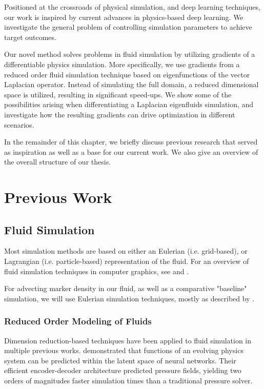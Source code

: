 Positioned at the crossroads of physical simulation, and deep learning
techniques, our work is inspired by current advances in physics-based deep
learning. We investigate the general problem of controlling simulation
parameters to achieve target outcomes.

Our novel method solves problems in fluid simulation by utilizing gradients of
a differentiable physics simulation. More specifically, we use gradients from
a reduced order fluid simulation technique based on eigenfunctions of the vector
Laplacian operator. Instead of simulating the full domain, a reduced dimensional
space is utilized, resulting in significant speed-ups. We show some of the
possibilities arising when differentiating a Laplacian eigenfluids simulation,
and investigate how the resulting gradients can drive optimization in different
scenarios.

In the remainder of this chapter, we briefly discuss previous research that
served as inspiration as well as a base for our current work. We also give an
overview of the overall structure of our thesis. 

\section{Previous Work}
\subsection{Fluid Simulation}
Most simulation methods are based on either an Eulerian (i.e.  grid-based), or
Lagrangian (i.e. particle-based) representation of the fluid.  For an overview
of fluid simulation techniques in computer graphics, see \citet{FluidNotes} and
\citet{BridsonFluid}. 

For advecting marker density in our fluid, as well as a comparative "baseline"
simulation, we will use Eulerian simulation techniques, mostly as described by
\citet{StableFluids}.

\subsubsection*{Reduced Order Modeling of Fluids}
Dimension reduction-based techniques have been applied to fluid simulation in
multiple previous works. \citet{Wiewel2019LatentSP} demonstrated that functions
of an evolving physics system can be predicted within the latent space of neural
networks. Their efficient encoder-decoder architecture predicted pressure
fields, yielding two orders of magnitudes faster simulation times than
a traditional pressure solver.

